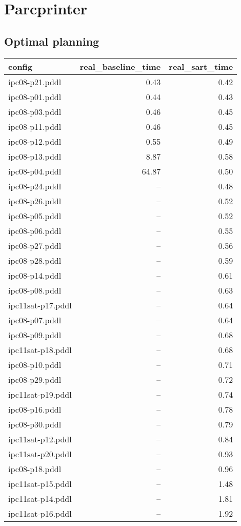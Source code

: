 \documentclass{article}
\begin{document}
                \newpage \section{Parcprinter}
                    \subsection*{Optimal planning}
                    
                            \begin{center}
                            \scriptsize
                            \begin{tabular}{@{}l|r|r@{}}
                            config & real\_baseline\_time & real\_sart\_time\\\midrule
                             ipc08-p21.pddl&0.43&0.42\\
 ipc08-p01.pddl&0.44&0.43\\
 ipc08-p03.pddl&0.46&0.45\\
 ipc08-p11.pddl&0.46&0.45\\
 ipc08-p12.pddl&0.55&0.49\\
 ipc08-p13.pddl&8.87&0.58\\
 ipc08-p04.pddl&64.87&0.50\\
 ipc08-p24.pddl&--&0.48\\
 ipc08-p26.pddl&--&0.52\\
 ipc08-p05.pddl&--&0.52\\
 ipc08-p06.pddl&--&0.55\\
 ipc08-p27.pddl&--&0.56\\
 ipc08-p28.pddl&--&0.59\\
 ipc08-p14.pddl&--&0.61\\
 ipc08-p08.pddl&--&0.63\\
 ipc11sat-p17.pddl&--&0.64\\
 ipc08-p07.pddl&--&0.64\\
 ipc08-p09.pddl&--&0.68\\
 ipc11sat-p18.pddl&--&0.68\\
 ipc08-p10.pddl&--&0.71\\
 ipc08-p29.pddl&--&0.72\\
 ipc11sat-p19.pddl&--&0.74\\
 ipc08-p16.pddl&--&0.78\\
 ipc08-p30.pddl&--&0.79\\
 ipc11sat-p12.pddl&--&0.84\\
 ipc11sat-p20.pddl&--&0.93\\
 ipc08-p18.pddl&--&0.96\\
 ipc11sat-p15.pddl&--&1.48\\
 ipc11sat-p14.pddl&--&1.81\\
 ipc11sat-p16.pddl&--&1.92
                            \end{tabular}
                            \end{center}
                    
\end{document}
